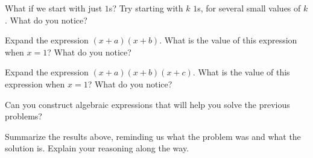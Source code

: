 \documentclass{ximera}
\begin{document}
\begin{problem}
What if we start with just $1$s?  Try starting with $k$ $1$s, for several small values of $k$.  What do you notice?  
\begin{freeResponse}
\end{freeResponse}
\vfill
\end{problem}

\newpage 

\begin{problem}
Expand the expression $(x+a)(x+b)$.  What is the value of this expression when $x=1$?  What do you notice?
\begin{freeResponse}
\end{freeResponse}
\vfill
\end{problem}

\begin{problem}
Expand the expression $(x+a)(x+b)(x+c)$.  What is the value of this expression when $x=1$?  What do you notice?
\begin{freeResponse}
\end{freeResponse}
\vfill
\end{problem}

\newpage 

\begin{problem}
Can you construct algebraic expressions that will help you solve the previous problems?  
\begin{freeResponse}
\end{freeResponse}
\vfill
\end{problem}

\begin{problem}
Summarize the results above, reminding us what the problem was and
what the solution is. Explain your reasoning along the way.
\begin{freeResponse}
\end{freeResponse}
\vfill
\end{problem}
\end{document}
